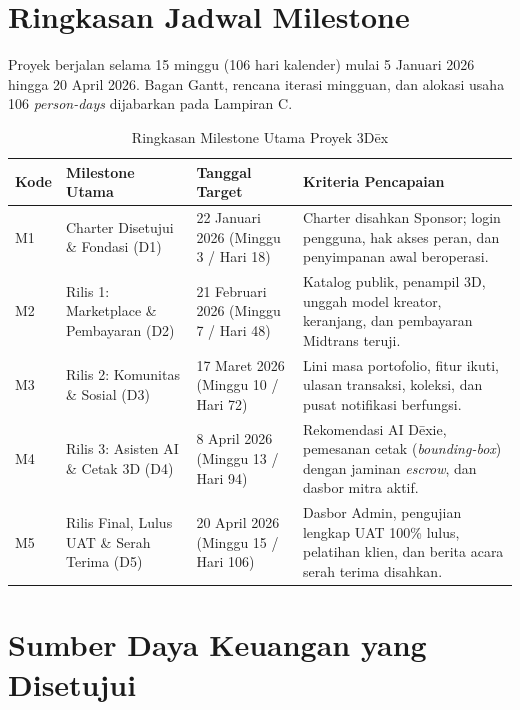 \documentclass[11pt,a4paper]{article}
\newcommand{\thdr}[1]{\centering\arraybackslash\textbf{#1}}
\begin{document}
\section{Ringkasan Jadwal Milestone}

Proyek berjalan selama 15 minggu (106 hari kalender) mulai 5 Januari 2026 hingga 20 April 2026. Bagan Gantt, rencana iterasi mingguan, dan alokasi usaha 106 \textit{person-days} dijabarkan pada Lampiran C.

\begin{table}[H]
\centering
\caption{Ringkasan Milestone Utama Proyek 3D\={e}x}
\begin{tabularx}{\textwidth}{| C{1.1cm} | L{4.3cm} | C{2.9cm} | Y |}
\hline
{} \thdr{Kode} & \thdr{Milestone Utama} & \thdr{Tanggal Target} & \thdr{Kriteria Pencapaian} \\
\hline
M1 & Charter Disetujui \& Fondasi (D1) & 22 Januari 2026 (Minggu 3 / Hari 18) & Charter disahkan Sponsor; login pengguna, hak akses peran, dan penyimpanan awal beroperasi. \\
\hline
M2 & Rilis 1: Marketplace \& Pembayaran (D2) & 21 Februari 2026 (Minggu 7 / Hari 48) & Katalog publik, penampil 3D, unggah model kreator, keranjang, dan pembayaran Midtrans teruji. \\
\hline
M3 & Rilis 2: Komunitas \& Sosial (D3) & 17 Maret 2026 (Minggu 10 / Hari 72) & Lini masa portofolio, fitur ikuti, ulasan transaksi, koleksi, dan pusat notifikasi berfungsi. \\
\hline
M4 & Rilis 3: Asisten AI \& Cetak 3D (D4) & 8 April 2026 (Minggu 13 / Hari 94) & Rekomendasi AI D\={e}xie, pemesanan cetak (\textit{bounding-box}) dengan jaminan \textit{escrow}, dan dasbor mitra aktif. \\
\hline
M5 & Rilis Final, Lulus UAT \& Serah Terima (D5) & 20 April 2026 (Minggu 15 / Hari 106) & Dasbor Admin, pengujian lengkap UAT 100\% lulus, pelatihan klien, dan berita acara serah terima disahkan. \\
\hline
\end{tabularx}
\end{table}

\clearpage
\section{Sumber Daya Keuangan yang Disetujui}
\end{document}
